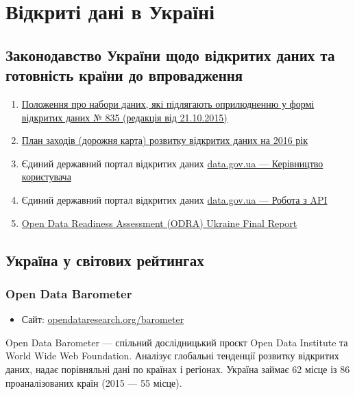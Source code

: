 \chapter{Відкриті дані в Україні}

\section{Законодавство України щодо відкритих даних та готовність країни до впровадження}

\begin{enumerate}
    \item \href{http://zakon2.rada.gov.ua/laws/show/319-19}{Положення про набори даних, які підлягають оприлюдненню у формі відкритих даних № 835 (редакція від 21.10.2015)}
    \item \href{https://drive.google.com/file/d/0B1kGsKt9XV_QaFZVaTZiT19aRTA/view}{План заходів (дорожня карта) розвитку відкритих даних на 2016 рік}
    \item Єдиний державний портал відкритих даних \href{https://data.gov.ua/}{data.gov.ua — Керівництво користувача}
    \item Єдиний державний портал відкритих даних \href{https://data.gov.ua/}{data.gov.ua — Робота з API}
    \item \href{https://docs.google.com/document/d/1g5VUhUzjgTVvcp7zvlWbCUsmoJNaQ6w4T3vacYSu34U/edit}{Open Data Readiness Assessment (ODRA) Ukraine Final Report}
\end{enumerate}

\section{Україна у світових рейтингах}

\subsection{Open Data Barometer}

\begin{itemize}
    \item Сайт: \href{http://www.opendataresearch.org/barometer}{opendataresearch.org/barometer}
\end{itemize}

Open Data Barometer — спільний дослідницький проєкт Open Data Institute та World Wide Web Foundation. Аналізує глобальні тенденції розвитку відкритих даних, надає порівняльні дані по країнах і регіонах. Україна займає 62 місце із 86 проаналізованих країн (2015 — 55 місце).

